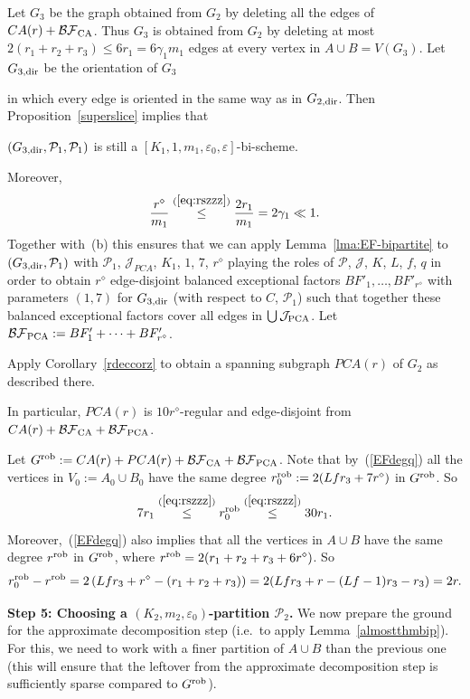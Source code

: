 \documentclass{memo-l}
\def\COMMENT#1{}
\def\cP{\mathcal{P}}
\def\eps{\varepsilon}
\def\cJ{\mathcal{J}}
\def\epszero{\eps_0}
\numberwithin{section}{chapter}
\numberwithin{equation}{section}
\numberwithin{firstthm}{section}
\numberwithin{figure}{section}
\begin{document}
{Let $G_3$ be the graph obtained from $G_2$ by deleting all the edges of $CA(r)+ \mathcal{BF}_{\rm CA}$.
Thus $G_3$ is obtained from $G_2$ by deleting at most $2(r_1+r_2+r_3)\le 6r_1=6\gamma_1m_1$ edges at every vertex in $A\cup B=V(G_3)$.
Let $G_{3,{\rm dir}}$ be the orientation of $G_3$%
    \COMMENT{Daniela: had $G_3-V_0$ instead of $G_3$}
in which every edge is oriented in the same way as in $G_{2,{\rm dir}}$.
Then Proposition~\ref{superslice} implies that%
   \COMMENT{Daniela added ref to Proposition~\ref{superslice}}
$(G_{3,{\rm dir}},\cP_1,\cP_1)$ is still a $[K_1, 1,m_1, \epszero,\eps]$-bi-scheme.%
\COMMENT{AL: changed to as $[K_1, m_1, \epszero,\eps]$-bi-scheme is no longer defined.}
Moreover,
$$\frac{r^\diamond}{m_1}\stackrel{(\ref{eq:rszzz})}{\le} \frac{2r_1}{m_1}=2\gamma_1\ll 1.$$
Together with~(b) this ensures that we can apply
Lemma~\ref{lma:EF-bipartite} to $(G_{3,{\rm dir}},\cP_1)$ with $\cP_1$, $\cJ_{PCA}$, $K_1$, $1$, $7$, $r^\diamond$ playing the roles of
$\cP$, $\cJ$, $K$, $L$, $f$, $q$ in order to obtain $r^\diamond$ edge-disjoint balanced exceptional factors $BF'_1,\dots,BF'_{r^\diamond}$ with parameters $(1,7)$
for $G_{3,{\rm dir}}$ (with respect to $C$, $\mathcal P_1$) such that together these balanced exceptional factors
cover all edges in $\bigcup \mathcal{J}_{\rm PCA}$. Let $\mathcal{BF}_{\rm PCA}:=BF'_1+\dots + BF'_{r^\diamond}$.

Apply Corollary~\ref{rdeccorz} to obtain a spanning
subgraph $PCA(r)$ of $G_2$ as described there.%
   \COMMENT{Daniela: had $G_2-V_0$ instead of $G_2$}
In particular, $PCA(r)$ is $10r^\diamond$-regular
and edge-disjoint from $CA(r)+ \mathcal{BF}_{\rm CA}+ \mathcal{BF}_{\rm PCA}$.

Let $G^{\rm rob}:=CA(r)+ PCA(r)+ \mathcal{BF}_{\rm CA}+ \mathcal{BF}_{\rm PCA}$.
Note that by~(\ref{EFdegq}) all the vertices in $V_0:=A_0\cup B_0$ have the same degree  
$r_0^{\rm rob}:=2(Lfr_3+7r^\diamond)$ in $G^{\rm rob}$.
So 
\begin{equation}\label{eq:rrobzz}
7r_1\stackrel{(\ref{eq:rszzz})}{\le} r_0^{\rm rob} \stackrel{(\ref{eq:rszzz})}{\le} 30r_1.
\end{equation}
Moreover,~(\ref{EFdegq}) also implies that all the vertices in $A\cup B$ have the same degree $r^{\rm rob}$ in $G^{\rm rob}$,
where $r^{\rm rob}=2(r_1+r_2+r_3+6r^\diamond)$. So 
$$
r_0^{\rm rob}-r^{\rm rob}=2 \left(Lfr_3+ r^\diamond- (r_1+r_2+r_3)\right)=2(Lfr_3+r-(Lf-1)r_3-r_3 )=2r.
$$

\noindent\textbf{Step 5: Choosing a $(K_2,m_2,\eps_0)$-partition $\cP_2$.}
We now prepare the ground for the approximate decomposition step (i.e.~to apply Lemma~\ref{almostthmbip}). 
For this, we need to work with a finer partition of $A \cup B$ than the previous one
(this will ensure that the leftover from the approximate decomposition step is sufficiently sparse compared to $G^{\rm rob}$).

}
\end{document}
